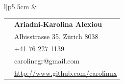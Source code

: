 \documentclass[10pt]{article} %
\begin{document}
\begin{minipage}[t]{0.44\textwidth} %
\vspace{0pt} %


\colorbox{shade}{\textcolor{text1}{
        \begin{tabular}{l|p{5.5cm}}
             &
        \begin{tabular}{l|p{5cm}}
    \raisebox{0pt}{\Smiley} & \textbf{Ariadni-Karolina Alexiou} \\ %
    \raisebox{-1pt}{\textifsymbol{18}} & Albisstrasse 35, Z\"urich 8038 \\ %
    \raisebox{-1pt}{\Mobilefone} & +41 76 227 1139\\ %
    \raisebox{-1pt}{\Letter} & carolinegr@gmail.com \\ %
    \Keyboard & \href{http://www.github.com/carolinux}{http://www.github.com/carolinux} \\ %
        \end{tabular}  \\ %
\end{tabular}
}
}\\[10pt]







\end{minipage}
\end{document}
